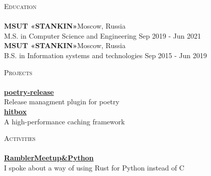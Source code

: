 \documentclass[a4paper]{article}
\newcommand{\lineunder} {
    \vspace*{-8pt} \\
    \hspace*{-18pt} \hrulefill \\
}
\newcommand{\header} [1] {
    {\hspace*{-18pt}\vspace*{6pt} \textsc{#1}}
    \vspace*{-6pt} \lineunder
}
\begin{document}
\header{Education}
\textbf{MSUT «STANKIN»}\hfill Moscow, Russia\\
M.S. in Computer Science and Engineering \hfill Sep 2019 - Jun 2021\\
\vspace{2mm}
\textbf{MSUT «STANKIN»}\hfill Moscow, Russia\\
B.S. in Information systems and technologies \hfill Sep 2015 - Jun 2019\\
\vspace{2mm}

\newpage

\header{Projects}
{\textbf{\href{https://github.com/topenkoff/poetry-release}{poetry-release}}}\\
Release managment plugin for poetry\\

\vspace*{2mm}
{\textbf{\href{https://github.com/hit-box/hitbox}{hitbox}}}\\
A high-performance caching framework\\
\vspace*{2mm}


\header{Activities}
{\textbf{\href{https://www.youtube.com/watch?v=gpf_KOAmgzY&t=3040s}{RamblerMeetup\&Python}}}\\
I spoke about a way of using Rust for Python instead of C\\
\vspace*{2mm}
\end{document}
